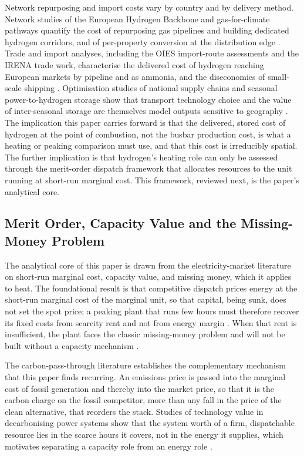 Network repurposing and import costs vary by country and by delivery method.
Network studies of the European Hydrogen Backbone and gas-for-climate pathways
quantify the cost of repurposing gas pipelines and building dedicated hydrogen
corridors, and of per-property conversion at the distribution edge
\citep{GasForClimate2020backbone,EHB2023countries}. Trade and import analyses, including the OIES
import-route assessments and the IRENA trade work, characterise the delivered cost
of hydrogen reaching European markets by pipeline and as ammonia, and the
diseconomies of small-scale shipping \citep{OIES2022hydrogenimports,OIES2024hydrogenimportsET32}. Optimisation studies of national supply chains and
seasonal power-to-hydrogen storage show that transport technology choice and the
value of inter-seasonal storage are themselves model outputs sensitive to geography
\citep{Lahnaoui2021Optimization,Petkov2020Powertohydrogen}. The implication
this paper carries forward is that the delivered, stored cost of hydrogen at the
point of combustion, not the busbar production cost, is what a heating or peaking
comparison must use, and that this cost is irreducibly spatial.
The further implication is that hydrogen's heating role can only be assessed
through the merit-order dispatch framework that allocates resources to the unit
running at short-run marginal cost. This framework, reviewed next, is the paper's
analytical core.

\subsection{Merit Order, Capacity Value and the Missing-Money Problem}
\label{sec:lit:meritorder}

The analytical core of this paper is drawn from the electricity-market literature on
short-run marginal cost, capacity value, and missing money, which it applies to heat.
The foundational result is that competitive dispatch prices energy at the short-run
marginal cost of the marginal unit, so that capital, being sunk, does not set the spot
price; a peaking plant that runs few hours must therefore recover its fixed costs from
scarcity rent and not from energy margin \citep{Joskow2008capacity}. When that rent is
insufficient, the plant faces the classic missing-money problem
\citep{Joskow2008capacity} and will not be built without a capacity mechanism
\citep{Competition2021}.

The carbon-pass-through literature \citep{Fabra2009etspassthrough} establishes the
complementary mechanism that this paper finds recurring. An emissions price is passed
into the marginal cost of fossil generation and thereby into the market price, so that
it is the carbon charge on the fossil competitor, more than any fall in the price of the
clean alternative, that reorders the stack. Studies of technology value in decarbonising
power systems show that the system worth of a firm, dispatchable resource lies in the
scarce hours it covers, not in the energy it supplies, which motivates separating a
capacity role from an energy role
\citep{Bistline2020ValueOfTechnology,Brown2018Synergies}.

